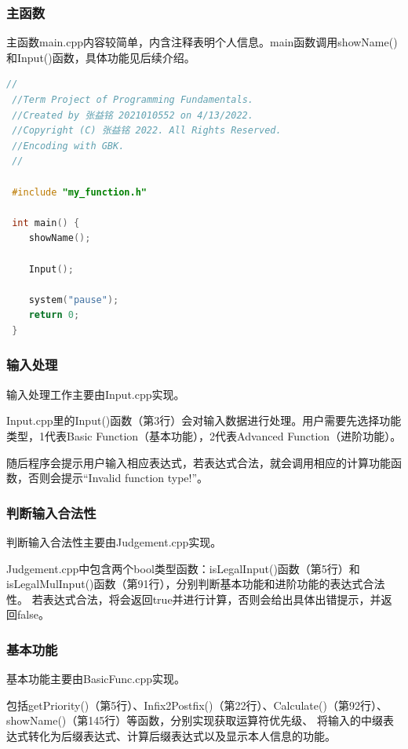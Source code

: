 \documentclass[a4paper, 11pt, UTF8]{ctexart}
\begin{document}
\subsubsection{主函数}

主函数main.cpp内容较简单，内含注释表明个人信息。main函数调用showName()和Input()函数，具体功能见后续介绍。

\begin{lstlisting}[language=C++, basicstyle=\ttfamily]
 //
 //Term Project of Programming Fundamentals.
 //Created by 张益铭 2021010552 on 4/13/2022.
 //Copyright (C) 张益铭 2022. All Rights Reserved.
 //Encoding with GBK.
 //

 #include "my_function.h"

 int main() {
    showName();
    
    Input();
    
    system("pause");
    return 0;
 }    
\end{lstlisting}

\subsubsection{输入处理}

输入处理工作主要由Input.cpp实现。

Input.cpp里的Input()函数（第3行）会对输入数据进行处理。用户需要先选择功能类型，1代表Basic Function（基本功能），2代表Advanced Function（进阶功能）。

随后程序会提示用户输入相应表达式，若表达式合法，就会调用相应的计算功能函数，否则会提示“Invalid function type!”。

\subsubsection{判断输入合法性}

判断输入合法性主要由Judgement.cpp实现。

Judgement.cpp中包含两个bool类型函数：isLegalInput()函数（第5行）和isLegalMulInput()函数（第91行），分别判断基本功能和进阶功能的表达式合法性。
若表达式合法，将会返回true并进行计算，否则会给出具体出错提示，并返回false。

\subsubsection{基本功能}

基本功能主要由BasicFunc.cpp实现。

包括getPriority()（第5行）、Infix2Postfix()（第22行）、Calculate()（第92行）、showName()（第145行）等函数，分别实现获取运算符优先级、
将输入的中缀表达式转化为后缀表达式、计算后缀表达式以及显示本人信息的功能。
\end{document}
